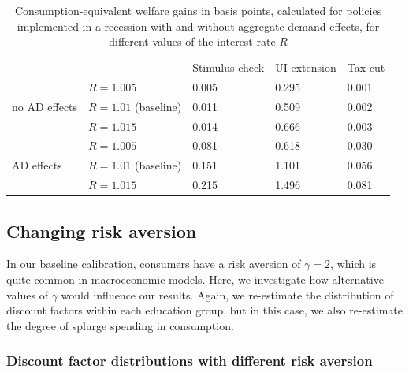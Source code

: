 \documentclass[\econtexRoot/HAFiscal]{subfiles}
\begin{document}
\begin{table}[t]
	\begin{center}
		\begin{tabular}{@{}lllll@{}}
			\toprule
			&                    & Stimulus check & UI extension & Tax cut \\ \cmidrule(l){1-5} 
			\multirow{3}{*}{no AD effects}            	& $R = 1.005$ 			& 0.005        & 0.295       & 0.001	\\
			& $R = 1.01$ (baseline) & 0.011        & 0.509       & 0.002   	\\
			& $R = 1.015$ 			& 0.014        & 0.666       & 0.003   	\\ \cmidrule(l){1-5}
			\multirow{3}{*}{AD effects}					& $R = 1.005$    		& 0.081        & 0.618       & 0.030  	\\		
			& $R = 1.01$ (baseline) & 0.151        & 1.101       & 0.056   	\\
			& $R = 1.015$    		& 0.215        & 1.496       & 0.081    \\ \cmidrule(l){1-5} 
		\end{tabular}
		\caption{Consumption-equivalent welfare gains in basis points, calculated for policies implemented in a recession with and without aggregate demand effects, for different values of the interest rate $R$}
		\notinsubfile{\label{tab:robustness_R_results}}
	\end{center}
\end{table}


\FloatBarrier
\hypertarget{changing-risk-aversion}{}\par\subsection{Changing risk aversion} 
\notinsubfile{\label{sec:robust_gamma}} 

In our baseline calibration, consumers have a risk aversion of $\gamma=2$, which is quite common in macroeconomic models.
Here, we investigate how alternative values of $\gamma$ would influence our results.
Again, we re-estimate the distribution of discount factors within each education group, but in this case, we also re-estimate the degree of splurge spending in consumption.


\subsubsection{Discount factor distributions with different risk aversion}
\notinsubfile{\label{sec:robust_gamma_estim}}
\end{document}
